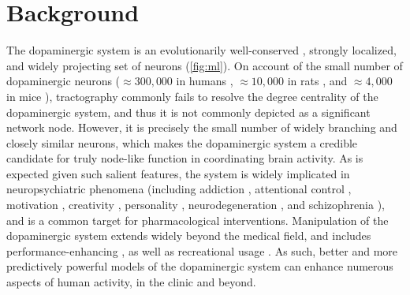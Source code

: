 \section{Background}


The dopaminergic system is an evolutionarily well-conserved \cite{Yamamoto2011}, strongly localized, and widely projecting set of neurons (\cref{fig:ml}).
On account of the small number of dopaminergic neurons ($\approx300,000$ in humans \cite{rice2016}, $\approx10,000$ in rats \cite{german1993}, and $\approx4,000$ in mice \cite{triarhou1988}), tractography commonly fails to resolve the degree centrality of the dopaminergic system, and thus it is not commonly depicted as a significant network node.
However, it is precisely the small number of widely branching and closely similar neurons, which makes the dopaminergic system a credible candidate for truly node-like function in coordinating brain activity.
As is expected given such salient features, the system is widely implicated in neuropsychiatric phenomena (including
addiction \cite{DiChiara1988,DiChiara1999},
attentional control \cite{Nieoullon2002},
motivation \cite{Salamone1994},
creativity \cite{Chermahini2010},
personality \cite{Depue1999},
neurodegeneration \cite{Masliah2000},
and schizophrenia \cite{Howes2009}),
and is a common target for pharmacological interventions.
Manipulation of the dopaminergic system extends widely beyond the medical field, and includes performance-enhancing \cite{Mehta2000,Turner2003}, as well as recreational usage \cite{DiChiara1988}.
As such, better and more predictively powerful models of the dopaminergic system can enhance numerous aspects of human activity, in the clinic and beyond.

